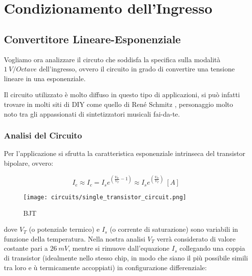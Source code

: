\chapter{Condizionamento dell'Ingresso}


\section{Convertitore Lineare-Esponenziale}


Vogliamo ora analizzare il circuto che soddisfa la specifica sulla modalità $1\ V/Octave$
dell'ingresso, ovvero il circuito in grado di convertire una tensione lineare in una
esponenziale.

Il circuito utilizzato è molto diffuso in questo tipo di applicazioni, si può infatti
trovare in molti siti di DIY come quello di René Schmitz \cite{expo_converter}, personaggio
molto noto tra gli appassionati di sintetizzatori musicali fai-da-te.


\subsection*{Analisi del Circuito}


Per l'applicazione si sfrutta la caratteristica esponenziale intrinseca del transistor
bipolare, ovvero:

\begin{displaymath}
    I_e\approx I_c=I_se^{\left(\frac{V_{be}}{V_T}-1\right)}
    \approx I_se^{\left(\frac{V_{be}}{V_T}\right)}\ [A]
\end{displaymath}

\begin{figure}[H]
    \centering
    \texttt{[image: circuits/single\_transistor\_circuit.png]}
    \caption{BJT}
    \label{bjt}
\end{figure}

dove $V_T$ (o potenziale termico) e $I_s$ (o corrente di saturazione) sono variabili in
funzione della temperatura. Nella nostra analisi $V_T$ verrà considerato di valore costante
pari a $26\ mV$, mentre si rimuove dall'equazione $I_s$ collegando una coppia di transistor
(idealmente nello stesso chip, in modo che siano il più possibile simili tra loro e ù
termicamente accoppiati) in configurazione differenziale:

